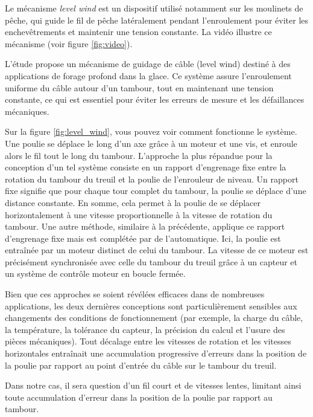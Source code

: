 \documentclass[a4paper, 11pt]{report}
\begin{document}
            Le mécanisme \textit{level wind} est un dispositif utilisé notamment sur les moulinets de pêche, qui guide le fil de pêche latéralement pendant l’enroulement pour éviter les enchevêtrements et maintenir une tension constante. La vidéo \cite{hugh_lyman_level_2014} illustre ce mécanisme (voir figure \ref{fig:video}).

            L'étude \cite{mortensen_precision_2014} propose un mécanisme de guidage de câble (level wind) destiné à des applications de forage profond dans la glace. Ce système assure l'enroulement uniforme du câble autour d'un tambour, tout en maintenant une tension constante, ce qui est essentiel pour éviter les erreurs de mesure et les défaillances mécaniques.

            Sur la figure \ref{fig:level_wind}, vous pouvez voir comment fonctionne le système. Une poulie se déplace le long d'un axe grâce à un moteur et une vis, et enroule alors le fil tout le long du tambour. L'approche la plus répandue pour la conception d'un tel système consiste en un rapport d'engrenage fixe entre la rotation du tambour du treuil et la poulie de l'enrouleur de niveau. Un rapport fixe signifie que pour chaque tour complet du tambour, la poulie se déplace d'une distance constante. En somme, cela permet à la poulie de se déplacer horizontalement à une vitesse proportionnelle à la vitesse de rotation du tambour. Une autre méthode, similaire à la précédente, applique ce rapport d'engrenage fixe mais est complétée par de l'automatique. Ici, la poulie est entraînée par un moteur distinct de celui du tambour. La vitesse de ce moteur est précisément synchronisée avec celle du tambour du treuil grâce à un capteur et un système de contrôle moteur en boucle fermée. \cite{mortensen_precision_2014}

            Bien que ces approches se soient révélées efficaces dans de nombreuses applications, les deux dernières conceptions sont particulièrement sensibles aux changements des conditions de fonctionnement (par exemple, la charge du câble, la température, la tolérance du capteur, la précision du calcul et l'usure des pièces mécaniques). Tout décalage entre les vitesses de rotation et les vitesses horizontales entraînait une accumulation progressive d'erreurs dans la position de la poulie par rapport au point d'entrée du câble sur le tambour du treuil. \cite{mortensen_precision_2014}

            Dans notre cas, il sera question d'un fil court et de vitesses lentes, limitant ainsi toute accumulation d'erreur dans la position de la poulie par rapport au tambour.
\end{document}
